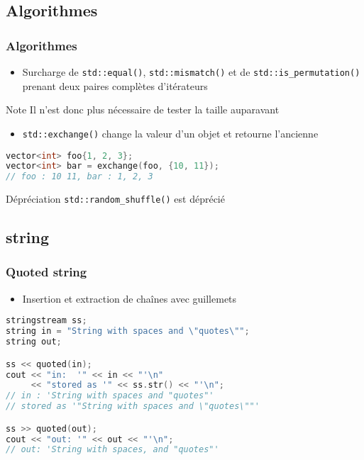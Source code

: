 \documentclass[C++.tex]{subfiles}
\begin{document}
\subsection*{Algorithmes}
\begin{frame}[fragile]
	\frametitle{Algorithmes}
	\begin{itemize}
		\item Surcharge de \lstinline|std::equal()|, \lstinline|std::mismatch()| et de \lstinline|std::is_permutation()| prenant deux paires complètes d'itérateurs
	\end{itemize}

	\begin{block}{Note}
		Il n'est donc plus nécessaire de tester la taille auparavant
	\end{block}

	\begin{itemize}
		\item \lstinline|std::exchange()| change la valeur d'un objet et retourne l'ancienne

	\end{itemize}

	\begin{lstlisting}[language=C++]
vector<int> foo{1, 2, 3};
vector<int> bar = exchange(foo, {10, 11});
// foo : 10 11, bar : 1, 2, 3\end{lstlisting}

	\begin{block}{Dépréciation}
		\lstinline|std::random_shuffle()| est déprécié

	\end{block}
\end{frame}

\subsection*{string}
\begin{frame}[fragile]
	\frametitle{Quoted string}
	\begin{itemize}
		\item Insertion et extraction de chaînes avec guillemets
	\end{itemize}

	\begin{lstlisting}[language=C++]
stringstream ss;
string in = "String with spaces and \"quotes\"";
string out;

ss << quoted(in);
cout << "in:  '" << in << "'\n"
     << "stored as '" << ss.str() << "'\n";
// in : 'String with spaces and "quotes"'
// stored as '"String with spaces and \"quotes\""'

ss >> quoted(out);
cout << "out: '" << out << "'\n";
// out: 'String with spaces, and "quotes"'\end{lstlisting}

\end{frame}
\end{document}
